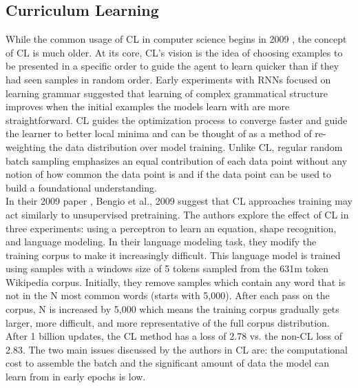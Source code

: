 \subsection{Curriculum Learning}
\label{chap:prior:sec:cl:cl}
While the common usage of CL in computer science begins in 2009 \cite{Bengio2009CurriculumL}, the concept of CL is much older. At its core, CL's vision is the idea of choosing examples to be presented in a specific order to guide the agent to learn quicker than if they had seen samples in random order. Early experiments with RNNs \cite{Elman1993LearningAD} focused on learning grammar suggested that learning of complex grammatical structure improves when the initial examples the models learn with are more straightforward. CL guides the optimization process to converge faster and guide the learner to better local minima and can be thought of as a method of re-weighting the data distribution over model training. Unlike CL, regular random batch sampling emphasizes an equal contribution of each data point without any notion of how common the data point is and if the data point can be used to build a foundational understanding.\\
In their 2009 paper \cite{Bengio2009CurriculumL}, Bengio et al., 2009 suggest that CL approaches training may act similarly to unsupervised pretraining. The authors explore the effect of CL in three experiments: using a perceptron to learn an equation, shape recognition, and language modeling. In their language modeling task, they modify the training corpus to make it increasingly difficult. This language model is trained using samples with a windows size of 5 tokens sampled from the 631m token Wikipedia corpus. Initially, they remove samples which contain any word that is not in the N most common words (starts with 5,000). After each pass on the corpus, N is increased by 5,000 which means the training corpus gradually gets larger, more difficult, and more representative of the full corpus distribution. After 1 billion updates, the CL method has a loss of 2.78 vs. the non-CL loss of 2.83. The two main issues discussed by the authors in CL are: the computational cost to assemble the batch and the significant amount of data the model can learn from in early epochs is low. \\
